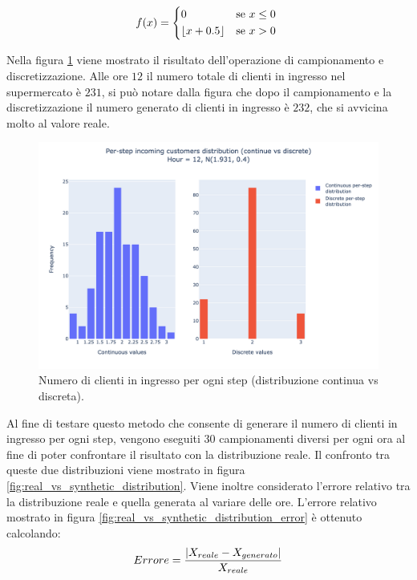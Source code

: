 \begin{equation}
	f(x)  =
	\begin{cases*}
		0 & se $x\leq0$ \\
		\floor{x + 0.5}       & se $x > 0$
	\end{cases*}
\end{equation}

Nella figura \ref{fig:continuous_vs_discrete_distributions} viene mostrato il risultato dell'operazione di campionamento e discretizzazione.  Alle ore $12$ il numero totale di clienti in ingresso nel supermercato è $231$, si può notare dalla figura che dopo il campionamento e la discretizzazione il numero generato di clienti in ingresso è $232$, che si avvicina molto al valore reale.

\begin{figure}[H]
	\centering
	\includegraphics[width=14cm]{"images/continuous_vs_discrete_distributions.png"}
	\caption{Numero di clienti in ingresso per ogni step (distribuzione continua vs discreta).}
	\label{fig:continuous_vs_discrete_distributions}
\end{figure}

Al fine di testare questo metodo che consente di generare il numero di clienti in ingresso per ogni step, vengono eseguiti 30 campionamenti diversi per ogni ora al fine di poter confrontare il risultato con la distribuzione reale. Il confronto tra queste due distribuzioni viene mostrato in figura \ref{fig:real_vs_synthetic_distribution}. Viene inoltre considerato l'errore relativo tra la distribuzione reale e quella generata al variare delle ore. L'errore relativo mostrato in figura \ref{fig:real_vs_synthetic_distribution_error} è ottenuto calcolando: $$Errore = \frac{\abs{X_{reale} - X_{generato}}}{X_{reale}}$$

